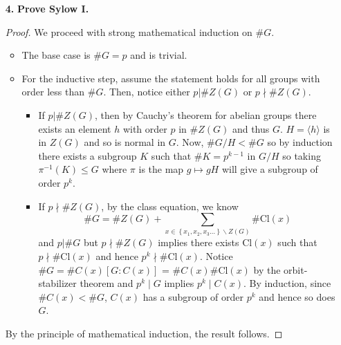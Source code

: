 \documentclass[letterpaper,12pt]{article}
\newcommand{\set}[1]{\left\{ #1 \right\}}
\begin{document}
\begin{enumerate}
    \item[\textbf{4.}] \textbf{Prove Sylow I.}
    \begin{proof}
       We proceed with strong mathematical induction on $\#G$. 
       \begin{itemize}
           \item The base case is $\# G = p$ and is trivial.
           \item For the inductive step, assume the statement holds for all groups with order less than $\# G$. Then, notice either $p|\#Z(G)$ or $p\nmid \#Z(G)$.
           \begin{itemize}
               \item If $p|\#Z(G)$, then by Cauchy's theorem for abelian groups there exists an element $h$ with order $p$ in $\#Z(G)$ and thus $G$. $H = \langle h \rangle$ is in $Z(G)$ and so is normal in $G$. Now, $\#G/H < \#G$ so by induction there exists a subgroup $K$ such that $\#K = p^{k-1}$ in $G/H$ so taking $\pi^{-1}(K)\leq G$ where $\pi$ is the map $g \mapsto gH$ will give a subgroup of order $p^k$.
               \item If $p\nmid \#Z(G)$, by the class equation, we know $$\# G = \#Z(G) + \sum_{x \in \set{x_1,x_2,x_3\ldots}\backslash Z(G)} \# \mathrm{Cl}(x)$$ and $p|\#G$ but $p\nmid \#Z(G)$ implies there exists $\mathrm{Cl}(x)$ such that $p\nmid \#\mathrm{Cl}(x)$ and hence $p^k\nmid \#\mathrm{Cl}(x)$. Notice $\#G = \#C(x)[G:C(x)]$ = $\#C(x)\#\mathrm{Cl}(x)$ by the orbit-stabilizer theorem and $p^k \mid G$ implies $p^k \mid C(x)$. By induction, since $\#C(x) < \#G$, $C(x)$ has a subgroup of order $p^k$ and hence so does $G$.
           \end{itemize}
       \end{itemize}
        By the principle of mathematical induction, the result follows.
    \end{proof}
\end{enumerate}
\end{document}
